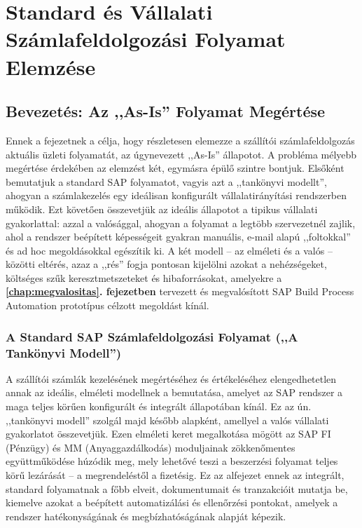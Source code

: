 
\chapter{Standard és Vállalati Számlafeldolgozási Folyamat Elemzése}
\label{ch:process-analysis}


\section{Bevezetés: Az ,,As-Is'' Folyamat Megértése}
\label{sec:as-is-introduction}

Ennek a fejezetnek a célja, hogy részletesen elemezze a szállítói számlafeldolgozás aktuális üzleti folyamatát, az úgynevezett ,,As-Is'' állapotot.
A probléma mélyebb megértése érdekében az elemzést két, egymásra épülő szintre bontjuk.
Elsőként bemutatjuk a standard SAP folyamatot, vagyis azt a ,,tankönyvi modellt'', ahogyan a számlakezelés egy ideálisan konfigurált vállalatirányítási rendszerben működik.
Ezt követően összevetjük az ideális állapotot a tipikus vállalati gyakorlattal: azzal a valósággal, ahogyan a folyamat a legtöbb szervezetnél zajlik, ahol a rendszer beépített képességeit gyakran manuális, e-mail alapú ,,foltokkal'' és ad hoc megoldásokkal egészítik ki.
A két modell – az elméleti és a valós – közötti eltérés, azaz a ,,rés'' fogja pontosan kijelölni azokat a nehézségeket, költséges szűk keresztmetszeteket és hibaforrásokat, amelyekre a \textbf{\ref{chap:megvalositas}. fejezetben} tervezett és megvalósított SAP Build Process Automation prototípus célzott megoldást kínál.


\subsection{A Standard SAP Számlafeldolgozási Folyamat (,,A Tankönyvi Modell'')}

A szállítói számlák kezelésének megértéséhez és értékeléséhez elengedhetetlen annak az ideális, elméleti modellnek a bemutatása, amelyet az SAP rendszer a maga teljes körűen konfigurált és integrált állapotában kínál.
Ez az ún. ,,tankönyvi modell'' szolgál majd később alapként, amellyel a valós vállalati gyakorlatot összevetjük.
Ezen elméleti keret megalkotása mögött az SAP FI (Pénzügy) és MM (Anyaggazdálkodás) moduljainak zökkenőmentes együttműködése húzódik meg, mely lehetővé teszi a beszerzési folyamat teljes körű lezárását – a megrendeléstől a fizetésig.
Ez az alfejezet ennek az integrált, standard folyamatnak a főbb elveit, dokumentumait és tranzakcióit mutatja be, kiemelve azokat a beépített automatizálási és ellenőrzési pontokat, amelyek a rendszer hatékonyságának és megbízhatóságának alapját képezik.

